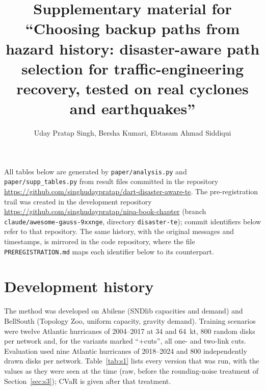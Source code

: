 \documentclass[12pt]{article}
\title{Supplementary material for\\ ``Choosing backup paths from hazard history: disaster-aware path selection for traffic-engineering recovery, tested on real cyclones and earthquakes''}
\author{Uday Pratap Singh, Bersha Kumari, Ebtasam Ahmad Siddiqui}
\date{}
\begin{document}
\maketitle

All tables below are generated by \texttt{paper/analysis.py} and \texttt{paper/supp\_tables.py} from result files committed in the repository \url{https://github.com/singhudaypratap/dart-disaster-aware-te}. The pre-registration trail was created in the development repository \url{https://github.com/singhudaypratap/nipa-book-chapter} (branch \texttt{claude/awesome-gauss-9xxnge}, directory \texttt{disaster-te}); commit identifiers below refer to that repository. The same history, with the original messages and timestamps, is mirrored in the code repository, where the file \texttt{PREREGISTRATION.md} maps each identifier below to its counterpart.

\section{Development history}
\label{sec:s1}

The method was developed on Abilene (SNDlib capacities and demand) and BellSouth (Topology Zoo, uniform capacity, gravity demand). Training scenarios were twelve Atlantic hurricanes of 2004--2017 at 34 and 64~kt, 800 random disks per network and, for the variants marked ``+cuts'', all one- and two-link cuts. Evaluation used nine Atlantic hurricanes of 2018--2024 and 800 independently drawn disks per network. Table~\ref{tab:s1} lists every version that was run, with the values as they were seen at the time (raw, before the rounding-noise treatment of Section~\ref{sec:s3}); CVaR is given after that treatment.
\end{document}
